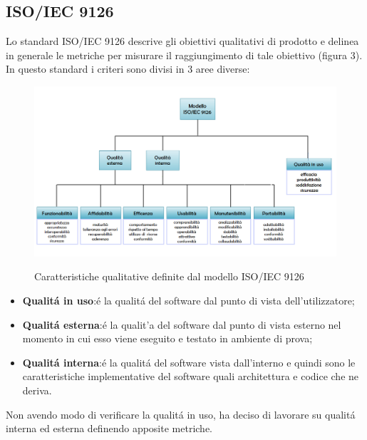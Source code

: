 \subsection{ISO/IEC 9126}
Lo standard ISO/IEC 9126 descrive gli obiettivi qualitativi di prodotto e delinea in generale le metriche per misurare il raggiungimento di tale obiettivo (figura 3). In questo standard i criteri sono divisi in 3 aree diverse:
\begin{figure} [H]
\centering
     \includegraphics[scale=0.5]{../modello/img/iso9126}\\
     \caption{Caratteristiche qualitative definite dal modello ISO/IEC 9126}\label{fig:3}
\end{figure}
\begin{itemize}
\item \textbf{Qualit\'a in uso}:\'e la qualit\'a del software dal punto di vista dell'utilizzatore;
\item \textbf{Qualit\'a esterna}:\'e la qualit'a del software dal punto di vista esterno nel momento in cui esso viene eseguito e testato in ambiente di prova;
\item \textbf{Qualit\'a interna}:\'e la qualit\'a del software vista dall'interno e quindi sono le caratteristiche implementative del software quali architettura e codice che ne deriva.
\end{itemize}
Non avendo modo di verificare la qualit\'a in uso, \gruppo ha deciso di lavorare su qualit\'a interna ed esterna definendo apposite metriche.

